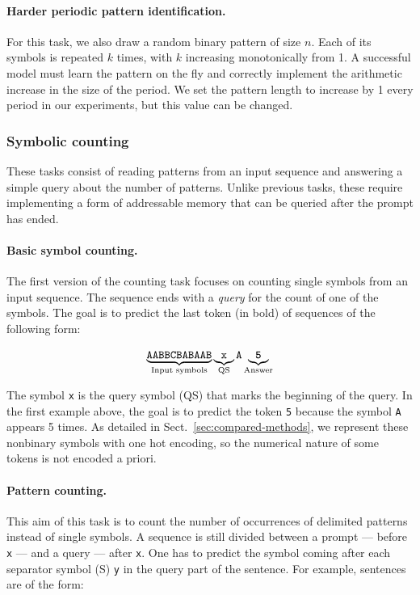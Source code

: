 \paragraph{Harder periodic pattern identification.}

For this task, we also draw a random binary pattern of size $n$. Each of its
symbols is repeated $k$ times, with $k$ increasing monotonically from 1. A
successful model must learn the pattern on the fly and correctly implement the
arithmetic increase in the size of the period. We set the pattern length to increase by
1 every period in our experiments, but this value can be changed.

\subsubsection{Symbolic counting}

These tasks consist of reading patterns from an input sequence and answering a
simple query about the number of patterns. Unlike previous tasks, these
require implementing a form of addressable memory that can be queried after the prompt has
ended.

\paragraph{Basic symbol counting.}
The first version of the counting task focuses on counting single symbols from
an input sequence. The sequence ends with a \emph{query} for the count of
one of the symbols. The goal is to predict the last token (in bold) of sequences
of the following form:

\begin{align*}
  \underbrace{\texttt{AABBCBABAAB}}_{\text{Input symbols}}
  & \underbrace{\texttt{x}}_{\text{QS}} \texttt{A}
    \underbrace{\textbf{\texttt{5}}}_{\text{Answer}} \\
\end{align*}

The symbol \texttt{x} is the query symbol (QS) that marks the beginning of the
query. In the first example above, the goal is to predict the token \texttt{5}
because the symbol \texttt{A} appears 5 times. As detailed in
Sect.~\ref{sec:compared-methods}, we represent these nonbinary symbols with
one hot encoding, so the numerical nature of some tokens is not encoded a priori.

\paragraph{Pattern counting.}
This aim of this task is to count the number of occurrences of delimited patterns
instead of single symbols. A sequence is still divided between a prompt --- before
\texttt{x} --- and a query --- after \texttt{x}. One has to predict the symbol
coming after each separator symbol (S) \texttt{y} in the query part of the
sentence. For example, sentences are of the form:


